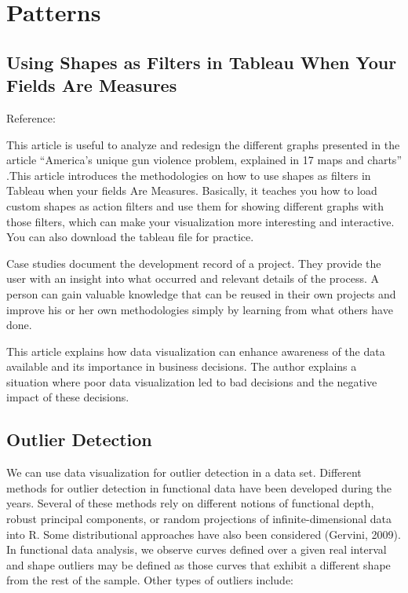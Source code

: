 \documentclass[]{book}
\theoremstyle{definition}
\theoremstyle{definition}
\theoremstyle{definition}
\theoremstyle{remark}
\begin{document}
\chapter{Patterns}\label{patterns}

\section{Using Shapes as Filters in Tableau When Your Fields Are
Measures}\label{using-shapes-as-filters-in-tableau-when-your-fields-are-measures}

Reference: \citep{interworks}

This article is useful to analyze and redesign the different graphs
presented in the article ``America's unique gun violence problem,
explained in 17 maps and charts'' \citep{gunviolence}.This article
introduces the methodologies on how to use shapes as filters in Tableau
when your fields Are Measures. Basically, it teaches you how to load
custom shapes as action filters and use them for showing different
graphs with those filters, which can make your visualization more
interesting and interactive. You can also download the tableau file for
practice.

Case studies document the development record of a project. They provide
the user with an insight into what occurred and relevant details of the
process. A person can gain valuable knowledge that can be reused in
their own projects and improve his or her own methodologies simply by
learning from what others have done.

This article explains how data visualization can enhance awareness of
the data available and its importance in business decisions. The author
explains a situation where poor data visualization led to bad decisions
and the negative impact of these decisions.

\section{Outlier Detection}\label{outlier-detection}

\citep{outliar}

We can use data visualization for outlier detection in a data set.
Different methods for outlier detection in functional data have been
developed during the years. Several of these methods rely on different
notions of functional depth, robust principal components, or random
projections of infinite-dimensional data into R. Some distributional
approaches have also been considered (Gervini, 2009). In functional data
analysis, we observe curves defined over a given real interval and shape
outliers may be defined as those curves that exhibit a different shape
from the rest of the sample. Other types of outliers include:
\end{document}
